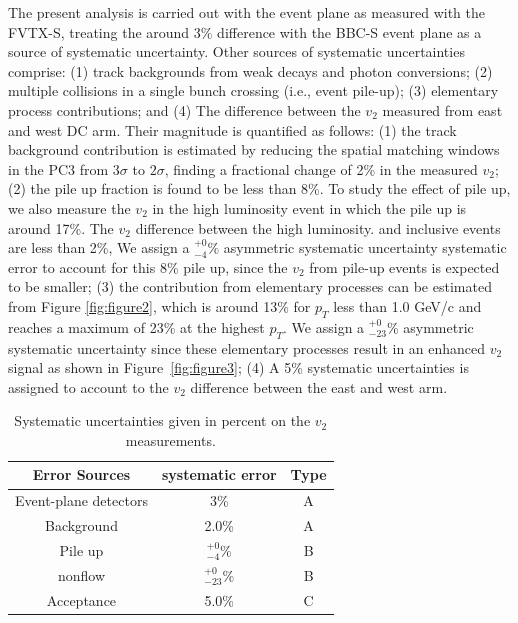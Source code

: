 \documentclass[%
reprint,
showpacs,preprintnumbers,
 amsmath,amssymb,
 aps,
]{revtex4-1}
\begin{document}

The present analysis is carried out with the event plane as measured with the FVTX-S, treating the around 3\% difference with the BBC-S event plane as a source of systematic uncertainty. Other sources of systematic uncertainties comprise: (1) track backgrounds from weak decays and photon conversions; (2) multiple collisions in a single bunch crossing (i.e., event pile-up); (3) elementary process contributions; and (4) The difference between the $v_2$ measured from east and west DC arm.
Their magnitude is quantified as follows: (1) the track background contribution is estimated by reducing the spatial matching windows in the PC3 from $3\sigma$ to $2\sigma$, finding a fractional change of 2\% in the measured $v_{2}$; (2) the pile up fraction is found to be less than 8\%. To study the effect of pile up, we also measure the $v_2$ in the high luminosity event in which the pile up is around 17\%. The $v_2$ difference between the high luminosity. and inclusive events are less than 2\%, We assign a $^{+0}_{-4}\%$ asymmetric systematic uncertainty systematic error to account for this 8\% pile up, since the $v_{2}$ from pile-up events is expected to be smaller; (3) the contribution from elementary processes can be estimated from Figure \ref{fig:figure2}, which is around 13\% for $p_T$ less than 1.0 GeV/c and reaches a maximum of 23\% at the highest $p_T$. We assign a $^{+0}_{-23}\%$ asymmetric systematic uncertainty since these elementary processes result in an enhanced $v_2$ signal as shown in Figure~\ref{fig:figure3}; (4) A 5\% systematic uncertainties is assigned to account to the $v_2$ difference between the east and west arm.

\label{s:sys}
\begin{table}[htbp]
  \begin{center}
    \begin{tabular}{ccc}
      \hline
      \hline
      Error Sources& systematic error & Type \\ \hline
      Event-plane detectors & 3\% & A\\
      Background &2.0\%& A\\
      Pile up    &$^{+0}_{-4}\%$& B\\
      nonflow    &$^{+0}_{-23}\%$& B\\
      Acceptance &5.0\%& C\\
    \hline
    \hline
    \end{tabular}
   \caption{\label{t:sys}Systematic uncertainties given in percent on the $v_2$ measurements.}
   \end{center}
 \end{table}
\end{document}
